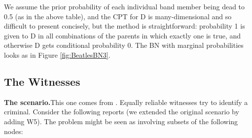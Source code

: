 \documentclass[10pt,]{scrartcl}
\newcommand{\s}[1]{\mbox{\textsf{#1}}}
\begin{document}
We assume the prior probability of each individual band member being
dead to 0.5 (as in the above table), and the CPT for \textsf{D} is
many-dimensional and so difficult to present concisely, but the method
is straightforward: probability 1 is given to \textsf{D} in all
combinations of the parents in which exactly one is true, and otherwise
\textsf{D} gets conditional probability 0. The BN with marginal probabilities looks as in Figure \ref{fig:BeatlesBN3}.







\subsection{The Witnesses}

\textbf{The scenario.}This one comes from \citep[391]{olsson2005}. Equally reliable witnesses try to identify a criminal. Consider the
following reports (we extended the original scenario by adding \s{W5}). The problem might be seen as involving subsets of the following nodes:
\end{document}
